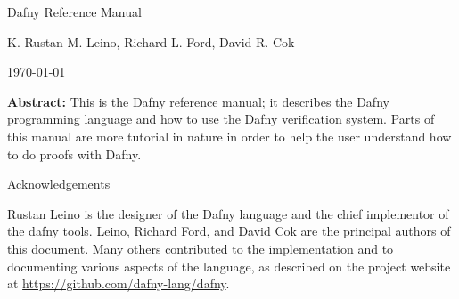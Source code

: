 \begin{center}\Huge Dafny Reference Manual\end{center}
\begin{center}K. Rustan M. Leino, Richard L. Ford, David R. Cok\end{center}
\begin{center}\today\end{center}
\vspace{1in}
\textbf{Abstract:} This is the Dafny reference manual; it  describes the Dafny programming
language and how to use the Dafny verification system.
Parts of this manual are more tutorial in nature in order to help the
user understand how to do proofs with Dafny.

\vspace{1in}
\begin{center}\Large Acknowledgements\end{center}
Rustan Leino is the designer of the Dafny language and the chief implementor of the dafny tools. Leino, Richard Ford, and David Cok are the principal authors of this document. Many others contributed to the implementation and to documenting various aspects of the language, as described on the project website at \url{https://github.com/dafny-lang/dafny}.
\newpage
